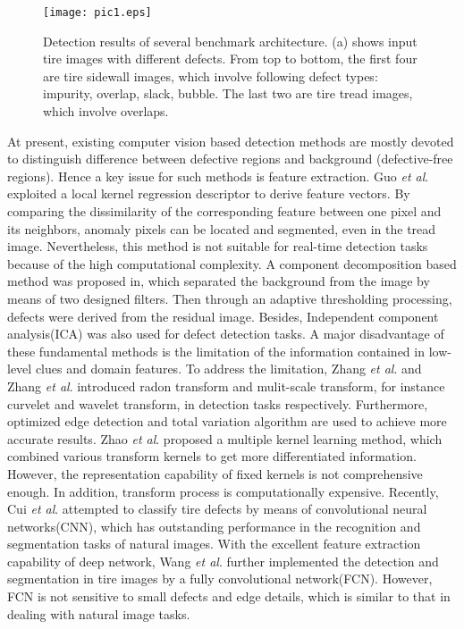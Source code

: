 \documentclass{article}
\begin{document}
\begin{figure}[t]
  \centering
  \centerline{\texttt{[image: pic1.eps]}}
  \caption{Detection results of several benchmark architecture. (a) shows input tire images with different defects. From top to bottom, the first four are tire sidewall images, which involve following defect types: impurity, overlap, slack, bubble. The last two are tire tread images, which involve overlaps. }
\end{figure}

At present, existing computer vision based detection methods are mostly devoted to distinguish difference between defective regions and background (defective-free regions). Hence a key issue for such methods is feature extraction. Guo {\it et al}.\cite{guo2016defect} exploited a local kernel regression descriptor to derive feature vectors. By comparing the dissimilarity of the corresponding feature between one pixel and its neighbors, anomaly pixels can be located and segmented, even in the tread image. Nevertheless, this method is not suitable for real-time detection tasks because of the high computational complexity. A component decomposition based method was proposed in\cite{guo2012tire}, which separated the background from the image by means of two designed filters. Then through an adaptive thresholding processing, defects were derived from the residual image. Besides, Independent component analysis(ICA) was also used for defect detection tasks\cite{cui2016defect,cui2016novel}. A major disadvantage of these fundamental methods is the limitation of the information contained in low-level clues and domain features. To address the limitation, Zhang {\it et al}.\cite{zhang2013texture} and Zhang {\it et al}.\cite{zhang2013defect} introduced radon transform and mulit-scale transform, for instance curvelet and wavelet transform, in detection tasks respectively. Furthermore, optimized edge detection and total variation algorithm are used to achieve more accurate results\cite{yan2013detection}. Zhao {\it et al}.\cite{zhao2017tire} proposed a multiple kernel learning method, which combined various transform kernels to get more differentiated information. However, the representation capability of fixed kernels is not comprehensive enough. In addition, transform process is computationally expensive. Recently, Cui {\it et al}.\cite{cui2018tire} attempted to classify tire defects by means of convolutional neural networks(CNN), which has outstanding performance in the recognition and segmentation tasks of natural images. With the excellent feature extraction capability of deep network, Wang {\it et al}.\cite{wang2019tire} further implemented the detection and segmentation in tire images by a fully convolutional network(FCN)\cite{long2015fully}. However, FCN is not sensitive to small defects and edge details, which is similar to that in dealing with natural image tasks.
\end{document}
